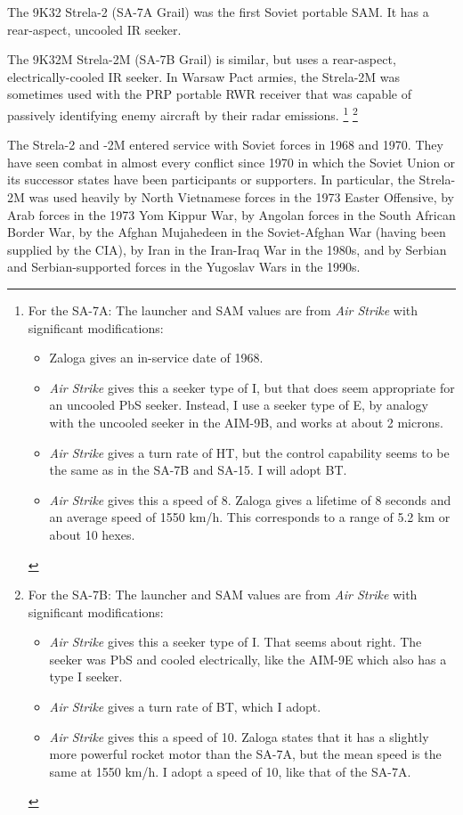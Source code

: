 \documentclass[10pt]{article}
\newcommand{\note}[1]{%
    \footnote{%
        \setlength{\parindent}{0pt}%
        \setlength{\parskip}{\smallskipamount}%
        #1
    }%
}
\begin{document}
The 9K32 Strela-2 (SA-7A Grail) was the first Soviet portable SAM. It has a rear-aspect, uncooled IR seeker.

The 9K32M Strela-2M (SA-7B Grail) is similar, but uses a rear-aspect, electrically-cooled IR seeker.
In Warsaw Pact armies, the Strela-2M was sometimes used with the PRP portable RWR receiver that was capable of passively identifying enemy aircraft by their radar emissions.%
\note{
    For the SA-7A: The launcher and SAM values are from \emph{Air Strike} with significant modifications:
    \begin{itemize}
        \item Zaloga gives an in-service date of 1968.
        \item \emph{Air Strike} gives this a seeker type of I, but that does seem appropriate for an uncooled PbS seeker. Instead, I use a seeker type of E, by analogy with the uncooled seeker in the AIM-9B, and works at about 2 microns.
        \item \emph{Air Strike} gives a turn rate of HT, but the control capability seems to be the same as in the SA-7B and SA-15. I will adopt BT.
        \item \emph{Air Strike} gives this a speed of 8. Zaloga gives a lifetime of 8 seconds and an average speed of 1550 km/h. This corresponds to a range of 5.2 km or about 10 hexes.
    \end{itemize}
}%
\note{
    For the SA-7B: The launcher and SAM values are from \emph{Air Strike} with significant modifications:
    \begin{itemize}
        \item \emph{Air Strike} gives this a seeker type of I. That seems about right. The seeker was PbS and cooled electrically, like the AIM-9E which also has a type I seeker.
        \item \emph{Air Strike} gives a turn rate of BT, which I adopt.
        \item \emph{Air Strike} gives this a speed of 10. Zaloga states that it has a slightly more powerful rocket motor than the SA-7A, but the mean speed is the same at 1550 km/h. I adopt a speed of 10, like that of the SA-7A.
    \end{itemize}
}

The Strela-2 and -2M entered service with Soviet forces in 1968 and 1970.
They have seen combat in almost every conflict since 1970 in which the Soviet Union or its successor states have been participants or supporters.
In particular, the Strela-2M was used heavily by North Vietnamese forces in the 1973 Easter Offensive, by Arab forces in the 1973 Yom Kippur War, by Angolan forces in the South African Border War, by the Afghan Mujahedeen in the Soviet-Afghan War (having been supplied by the CIA), by Iran in the Iran-Iraq War in the 1980s, and by Serbian and Serbian-supported forces in the Yugoslav Wars in the 1990s.
\end{document}
